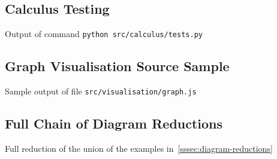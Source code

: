 \subsection{Calculus Testing}\label{ssec:appendix-calculus-tests}
    Output of command \texttt{python src/calculus/tests.py}
    \small\normalsize

\subsection{Graph Visualisation Source Sample}\label{ssec:appendix-graph-source}
    Sample output of file \texttt{src/visualisation/graph.js}
    \small\normalsize

\subsection{Full Chain of Diagram Reductions}\label{ssec:appendix-diagram-reduction}
    Full reduction of the union of the examples in~\ref{sssec:diagram-reductions}

